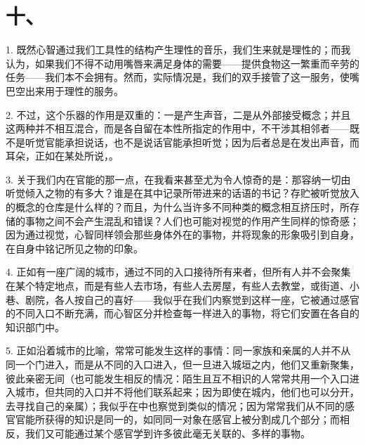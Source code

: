 
\section{十、}

1. 既然心智通过我们工具性的结构产生理性的音乐，我们生来就是理性的；而我认为，如果我们不得不动用嘴唇来满足身体的需要——提供食物这一繁重而辛劳的任务——我们本不会拥有。然而，实际情况是，我们的双手接管了这一服务，使嘴巴空出来用于理性的服务。\par

2. 不过，这个乐器的作用是双重的：一是产生声音，二是从外部接受概念；并且这两种并不相互混合，而是各自留在本性所指定的作用中，不干涉其相邻者——既不是听觉官能承担说话，也不是说话官能承担听觉；因为后者总是在发出声音，而耳朵，正如在某处所说，。\par

3. 关于我们内在官能的那一点，在我看来甚至尤为令人惊奇的是：那容纳一切由听觉倾入之物的有多大？谁是在其中记录所带进来的话语的书记？存贮被听觉放入的概念的仓库是什么样的？而且，为什么当许多不同种类的概念相互挤压时，所存储的事物之间不会产生混乱和错误？人们也可能对视觉的作用产生同样的惊奇感；因为通过视觉，心智同样领会那些身体外在的事物，并将现象的形象吸引到自身，在自身中铭记所见之物的印象。\par

4. 正如有一座广阔的城市，通过不同的入口接待所有来者，但所有人并不会聚集在某个特定地点，而是有些人去市场，有些人去房屋，有些人去教堂，或街道、小巷、剧院，各人按自己的喜好——我似乎在我们内察觉到这样一座，它被通过感官的不同入口不断充满，而心智区分并检查每一样进入的事物，将它们安置在各自的知识部门中。\par

5. 正如沿着城市的比喻，常常可能发生这样的事情：同一家族和亲属的人并不从同一个门进入，而是从不同的入口进入，但一旦进入城垣之内，他们又重新聚集，彼此亲密无间（也可能发生相反的情况：陌生且互不相识的人常常共用一个入口进入城市，但共同的入口并不将他们联系起来；因为即使在城内，他们也可以分开，去寻找自己的亲属）；我似乎在中也察觉到类似的情况；因为常常我们从不同的感官官能所获得的知识是同一的，如同同一对象在感官上被分割成几个部分；而相反，我们又可能通过某个感官学到许多彼此毫无关联的、多样的事物。\par

